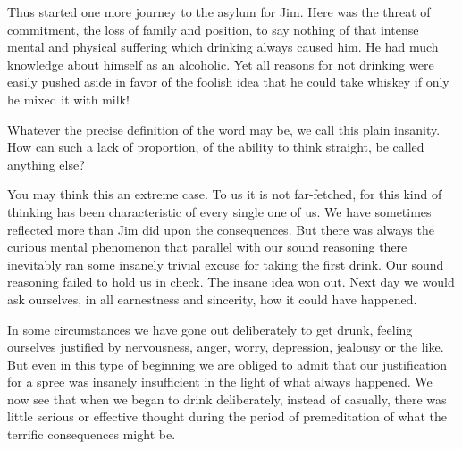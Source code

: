 \begin{biblechapter}
\verse Thus started one more journey to the asylum for Jim. 
\verse Here was the threat of commitment, 
    the loss of family and position, 
    to say nothing of that intense mental and physical suffering 
    which drinking always caused him. 
\verse He had much knowledge about himself as an alcoholic. 
\verse Yet all reasons for not drinking were easily pushed aside 
    in favor of the foolish idea that he could take whiskey 
    if only he mixed it with milk!
\end{biblechapter}


\begin{biblechapter}
    Whatever the precise definition of the word may be, 
    we call this plain insanity. 
\verse How can such a lack of proportion, 
    of the ability to think straight, 
    be called anything else?

\verse You may think this an extreme case. 
\verse To us it is not far-fetched, 
    for this kind of thinking 
    has been characteristic of every single one of us. 
\verse We have sometimes reflected more than Jim did upon the consequences. 
\verse But there was always the curious mental phenomenon 
    that parallel with our sound reasoning 
    there inevitably ran some insanely trivial excuse 
    for taking the first drink. 
\verse Our sound reasoning failed to hold us in check. 
\verse The insane idea won out. 
\verse Next day we would ask ourselves, 
    in all earnestness and sincerity, 
    how it could have happened.

\verse In some circumstances we have gone out deliberately to get drunk, 
    feeling ourselves justified by 
    nervousness, anger, worry, depression, jealousy or the like. 
\verse But even in this type of beginning we are obliged to admit 
    that our justification for a spree was insanely insufficient 
    in the light of what always happened. 
\verse We now see that when we began to drink deliberately, 
    instead of casually, 
    there was little serious 
    or effective thought during the period of premeditation 
    of what the terrific consequences might be.
\end{biblechapter}


